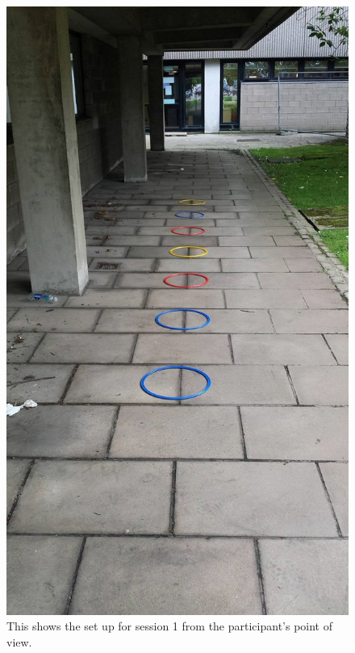\documentclass[12pt]{article}
\begin{document}
\begin{figure}[ht!]%
	\begin{center}
		\includegraphics[scale=0.25]{Figures/Experiment_1_Awareness/Layout_part1}
		\captionsetup{justification=centering}
		\caption{This shows the set up for session 1 from the participant's point of view.}
		\label{fig:Session1-Throwing}
	\end{center}
\end{figure}
\end{document}
